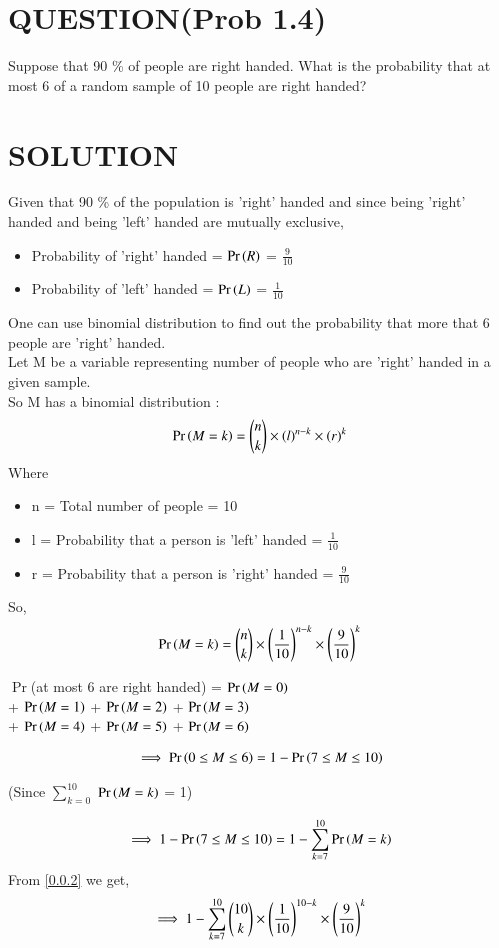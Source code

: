 \documentclass[journal,12pt,twocolumn]{IEEEtran}
\begin{document}
\section*{QUESTION(Prob 1.4)}
Suppose that 90 \% of people are right handed. 
What is the probability that at most 6 of a random sample 
of 10 people are right handed?\\
\section*{SOLUTION}
Given that 90 \% of the population is 'right' handed and since being 'right' handed and being 'left' handed are mutually exclusive,
\bigskip
\begin{itemize}
\item Probability of 'right' handed = $\Pr\left(R\right)$ = \(\frac{9}{10}\)
\item Probability of 'left' handed = $\Pr\left(L\right)$ = \( \frac{1}{10} \)
\end{itemize}
\bigskip
One can use binomial distribution to find out the probability that more that 6 people are 'right' handed.\\
Let M be a variable representing number of people who are 'right' handed in a given sample.\\
So M has a binomial distribution : 
\begin{align}
\Pr\left(M=k\right) = {{n}\choose{k}} \times (l)^{n-k} \times (r)^{k}\label{0.0.1}
\end{align}
Where
\begin{itemize}
    \item n = Total number of people = 10 
    \item l = Probability that a person is 'left' handed = \( \frac{1}{10} \)
    \item r = Probability that a person is 'right' handed = \( \frac{9}{10} \)
\end{itemize}
\bigskip
So,
\begin{align}
\Pr\left(M=k\right) = {{n}\choose{k}} \times \left(\frac{1}{10}\right)^{n-k} \times \left(\frac{9}{10}\right)^{k}\label{0.0.2}
\end{align}
\begin{center}
$\Pr$(at most 6 are right handed) = $\Pr\left(M = 0\right)$\\+ $\Pr\left(M = 1\right)$ + $\Pr\left(M = 2\right)$ + $\Pr\left(M = 3\right)$ \\+ $\Pr\left(M = 4\right)$ + $\Pr\left(M = 5\right)$ + $\Pr\left(M = 6\right)$\\ 
\end{center}
\begin{align}
\implies \Pr\left(0\leq M \leq 6\right) = 1 - \Pr\left(7 \leq M \leq10\right)\label{0.0.3}
\end{align}
\begin{center}
(Since $\sum_{k=0}^{10}$ $\Pr\left(M=k\right)$ = 1)\\
\end{center}
\begin{align}
\implies 1 - \Pr\left(7 \leq M \leq 10\right) = 1 - \sum_{k=7}^{10} \Pr\left(M=k\right)\label{0.0.4}
\end{align}
From \eqref{0.0.2} we get,
\begin{align}
\implies 1 - \sum_{k=7}^{10} {{10}\choose{k}} \times \left(\frac{1}{10}\right)^{10-k} \times \left(\frac{9}{10}\right)^{k}\label{0.0.5}
\end{align}
\end{document}
